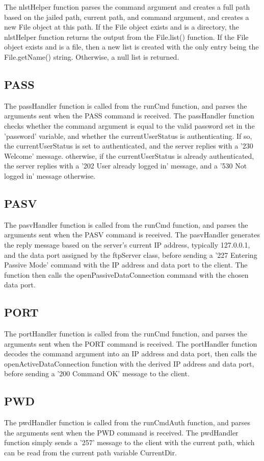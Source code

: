 \documentclass[11pt,a4paper,titlepage]{article}
\begin{document}
The nlstHelper function parses the command argument and creates a full path based on the jailed path, current path, and command argument, and creates a new File object at this path. If the File object exists and is a directory, the nlstHelper function returns the output from the File.list() function. If the File object exists and is a file, then a new list is created with the only entry being the File.getName() string. Otherwise, a null list is returned.

\subsection{PASS}
The passHandler function is called from the runCmd function, and parses the arguments sent when the PASS command is received. The passHandler function checks whether the command argument is equal to the valid password set in the 'password' variable, and whether the currentUserStatus is authenticating. If so, the currentUserStatus is set to authenticated, and the server replies with a '230 Welcome' message. otherwise, if the currentUserStatus is already authenticated, the server replies with a '202 User already logged in' message, and a '530 Not logged in' message otherwise.

\subsection{PASV}
The pasvHandler function is called from the runCmd function, and parses the arguments sent when the PASV command is received. The pasvHandler generates the reply message based on the server's current IP address, typically 127.0.0.1, and the data port assigned by the ftpServer class, before sending a '227 Entering Passive Mode' command with the IP address and data port to the client. The function then calls the openPassiveDataConnection command with the chosen data port.

\subsection{PORT}
The portHandler function is called from the runCmd function, and parses the arguments sent when the PORT command is received. The portHandler function decodes the command argument into an IP address and data port, then calls the openActiveDataConnection function with the derived IP address and data port, before sending a '200 Command OK' message to the client.

\subsection{PWD}
The pwdHandler function is called from the runCmdAuth function, and parses the arguments sent when the PWD command is received. The pwdHandler function simply sends a '257' message to the client with the current path, which can be read from the current path variable CurrentDir.
\end{document}
